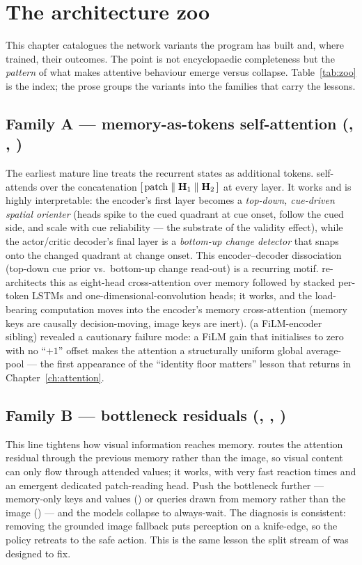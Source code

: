 \chapter{The architecture zoo}
\label{ch:zoo}

This chapter catalogues the network variants the program has built and, where trained,
their outcomes. The point is not encyclopaedic completeness but the \emph{pattern} of what
makes attentive behaviour emerge versus collapse. Table~\ref{tab:zoo} is the index;
the prose groups the variants into the families that carry the lessons.

\section{Family A --- memory-as-tokens self-attention (, , )}
The earliest mature line treats the recurrent states as additional tokens.  self-
attends over the concatenation $[\,\text{patch}\parallel\mathbf{H}_1\parallel\mathbf{H}_2\,]$ at every
layer. It works and is highly interpretable: the encoder's first layer becomes a
\emph{top-down, cue-driven spatial orienter} (heads spike to the cued quadrant at cue
onset, follow the cued side, and scale with cue reliability --- the substrate of the
validity effect), while the actor/critic decoder's final layer is a \emph{bottom-up change
detector} that snaps onto the changed quadrant at change onset. This encoder--decoder
dissociation (top-down cue prior vs.\ bottom-up change read-out) is a recurring motif.
 re-architects this as eight-head cross-attention over memory followed by
stacked per-token LSTMs and one-dimensional-convolution heads; it works, and the load-
bearing computation moves into the encoder's memory cross-attention (memory keys are
causally decision-moving, image keys are inert).  (a FiLM-encoder sibling) revealed
a cautionary failure mode: a FiLM gain that initialises to zero with no ``$+1$'' offset
makes the attention a structurally uniform global average-pool --- the first appearance of
the ``identity floor matters'' lesson that returns in Chapter~\ref{ch:attention}.

\section{Family B --- bottleneck residuals (, , )}
This line tightens how visual information reaches memory.  routes the attention
residual through the previous memory rather than the image, so visual content can only
flow through attended values; it works, with very fast reaction times and an emergent
dedicated patch-reading head. Push the bottleneck further --- memory-only keys and values
() or queries drawn from memory rather than the image () --- and the
models collapse to always-wait. The diagnosis is consistent: removing the grounded image
fallback puts perception on a knife-edge, so the policy retreats to the safe action. This
is the same lesson the split stream of  was designed to fix.

